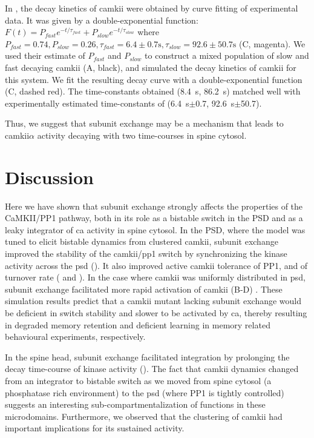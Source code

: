 \documentclass[9pt,lineno,doublespacing]{elife}
\begin{document}
In \cite{chang_camkii_2017}, the decay kinetics of \gls{camkii} were obtained by
curve fitting of experimental data. It was given by a double-exponential
function: $F(t)=P_{fast}e^{-t/\tau_{fast}}+P_{slow}e^{-t/\tau_{slow}}$ where
$P_{fast}=0.74, P_{slow}=0.26, \tau_{fast}= 6.4\pm0.7 \si{\second},
\tau_{slow}=92.6 \pm 50.7\si{\second}$ (C, magenta). We
used their estimate of $P_{fast}$ and $P_{slow}$ to construct a mixed population
of slow and fast decaying \gls{camkii} (A, black),
and simulated the decay kinetics of \gls{camkii} for this system. We fit the
resulting decay curve with a double-exponential function
(C, dashed red). The time-constants obtained
(\SI{8.4}{\second}, \SI{86.2}{\second}) matched well with experimentally
estimated time-constants of (\SI{6.4}{\second}$\pm$0.7,
\SI{92.6}{\second}$\pm$50.7). 

Thus, we suggest that subunit exchange may be a mechanism that leads to
\gls{camkii}$\alpha$ activity decaying with two time-courses in spine 
cytosol.

\section{Discussion}\label{discussion}

Here we have shown that subunit exchange strongly affects the properties of the
CaMKII/PP1 pathway, both in its role as a bistable switch in the PSD and as a
leaky integrator of \gls{ca} activity in spine cytosol. In the PSD, where the
model was tuned to elicit bistable dynamics from clustered \gls{camkii}, subunit
exchange improved the stability of the \gls{camkii}/\gls{pp1} switch by
synchronizing the kinase activity across the \gls{psd}
(). It also improved active \gls{camkii} tolerance of
PP1, and of turnover rate ( and ). In the case
where \gls{camkii} was uniformly distributed in \gls{psd}, subunit exchange
facilitated more rapid activation of \gls{camkii}
(B-D)
\citep{stratton_activation-triggered_2014}. These simulation results predict
that a \gls{camkii} mutant lacking subunit exchange would be deficient in switch
stability and slower to be activated by \gls{ca}, thereby resulting in degraded
memory retention and deficient learning in memory related behavioural
experiments, respectively.

In the spine head, subunit exchange facilitated integration by prolonging the
decay time-course of kinase activity (). The fact that
\gls{camkii} dynamics changed from an integrator to bistable switch as we moved
from spine cytosol (a phosphatase rich environment) to the \gls{psd} (where PP1
is tightly controlled) suggests an interesting sub-compartmentalization of
functions in these microdomains. Furthermore, we observed that the clustering of
\gls{camkii} had important implications for its sustained activity.
\end{document}
